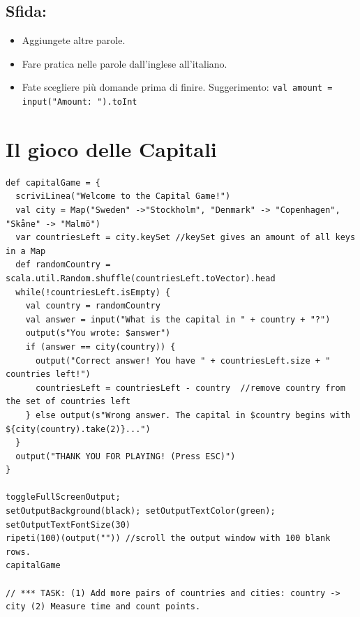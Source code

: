 \section*{\color{BrickRed}Sfida:}


\begin{itemize}

\item {Aggiungete altre parole.}
\item {Fare pratica nelle parole dall'inglese all'italiano.}
\item {Fate scegliere più domande prima di finire. Suggerimento: \lstinline{val amount = input("Amount: ").toInt} }

\end{itemize}


\chapter{Il gioco delle Capitali}
\begin{lstlisting}[basicstyle={\ttfamily\fontsize{13}{16}\selectfont},numbers=none]
def capitalGame = {
  scriviLinea("Welcome to the Capital Game!")
  val city = Map("Sweden" ->"Stockholm", "Denmark" -> "Copenhagen", "Skåne" -> "Malmö")
  var countriesLeft = city.keySet //keySet gives an amount of all keys in a Map 
  def randomCountry = scala.util.Random.shuffle(countriesLeft.toVector).head
  while(!countriesLeft.isEmpty) {
    val country = randomCountry
    val answer = input("What is the capital in " + country + "?")
    output(s"You wrote: $answer")
    if (answer == city(country)) {
      output("Correct answer! You have " + countriesLeft.size + " countries left!")
      countriesLeft = countriesLeft - country  //remove country from the set of countries left
    } else output(s"Wrong answer. The capital in $country begins with ${city(country).take(2)}...")
  }
  output("THANK YOU FOR PLAYING! (Press ESC)")
}

toggleFullScreenOutput;  
setOutputBackground(black); setOutputTextColor(green); setOutputTextFontSize(30)
ripeti(100)(output("")) //scroll the output window with 100 blank rows.
capitalGame

// *** TASK: (1) Add more pairs of countries and cities: country -> city (2) Measure time and count points.
\end{lstlisting}
        
